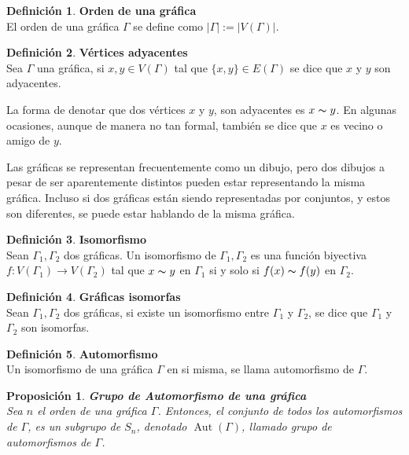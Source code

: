 \documentclass[12pt]{book}
\newtheorem{proposition}{Proposición}
\theoremstyle{definition}
\newtheorem{definition}{Definición}
\DeclareMathOperator{\Aut}{Aut}
\begin{document}
\begin{definition}\textbf{Orden de una gráfica}\\
  El orden de una gráfica $\Gamma$ se define como $|\Gamma|:= |V(\Gamma)|$.
\end{definition}

\begin{definition}\textbf{Vértices adyacentes}\\
  Sea $\Gamma$ una gráfica, si $x , y \in V(\Gamma)$ tal que
  $\{x,y\}\in E(\Gamma)$ se dice que $x$ y $y$ son adyacentes.
\end{definition}


La forma de denotar que dos vértices $x$ y $y$, son adyacentes es
$x\thicksim y$. En algunas ocasiones, aunque de manera no tan formal,
también se dice que $x$ es vecino o amigo de $y$.


Las gráficas se representan frecuentemente como un dibujo, pero
dos dibujos a pesar de ser aparentemente distintos pueden estar
representando la misma gráfica. Incluso si dos gráficas están siendo
representadas por conjuntos, y estos son diferentes, se puede estar
hablando de la misma gráfica.

\begin{definition}\textbf{Isomorfismo}\\
  Sean $\Gamma_1,\Gamma_2$ dos gráficas. Un isomorfismo de
  $\Gamma_1,\Gamma_2$ es una función biyectiva $f:
  V(\Gamma_1)\rightarrow V(\Gamma_2)$ tal que $x\thicksim y$ en
  $\Gamma_1$ si y solo si $f(x)\thicksim f(y)$ en $\Gamma_2$.
\end{definition}


\begin{definition}\textbf{Gráficas isomorfas}\\
  Sean $\Gamma_1,\Gamma_2$ dos gráficas, si existe un isomorfismo
  entre $\Gamma_1$ y $\Gamma_2$, se dice que $\Gamma_1$ y $\Gamma_2$
  son isomorfas.
\end{definition}


\begin{definition}\textbf{Automorfismo}\\
  Un isomorfismo de una gráfica $\Gamma$ en si misma, se llama automorfismo de
  $\Gamma$.
\end{definition}



\begin{proposition}\textbf{Grupo de Automorfismo de una gráfica}\\
  Sea $n$ el orden de una gráfica $\Gamma$. Entonces, el conjunto
  de todos los automorfismos de $\Gamma$, es un subgrupo de $S_n$,
  denotado $\Aut(\Gamma)$, llamado grupo de automorfismos de $\Gamma$.
\end{proposition}
\end{document}
